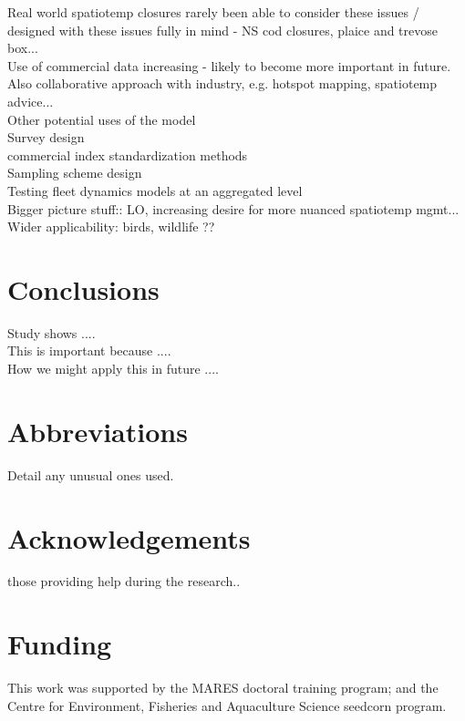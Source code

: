 \documentclass[review]{elsarticle}
\begin{document}
Real world spatiotemp closures rarely been able to consider these issues /
designed with these issues fully in mind - NS cod closures, plaice and trevose
box... \\

Use of commercial data increasing - likely to become more important in future.
Also collaborative approach with industry, e.g. hotspot mapping, spatiotemp
advice... \\


Other potential uses of the model \\

Survey design \\

commercial index standardization methods \\

Sampling scheme design \\

Testing fleet dynamics models at an aggregated level \\

Bigger picture stuff::  LO, increasing desire for more nuanced spatiotemp
mgmt... Wider applicability: birds, wildlife ?? 

\section{Conclusions}

Study shows ....\\

This is important because .... \\

How we might apply this in future .... \\

\section*{Abbreviations} Detail any unusual ones used.

\section*{Acknowledgements} those providing help during the research..

\section*{Funding} This work was supported by the MARES doctoral training
program; and the Centre for Environment, Fisheries and Aquaculture Science
seedcorn program.
\end{document}
